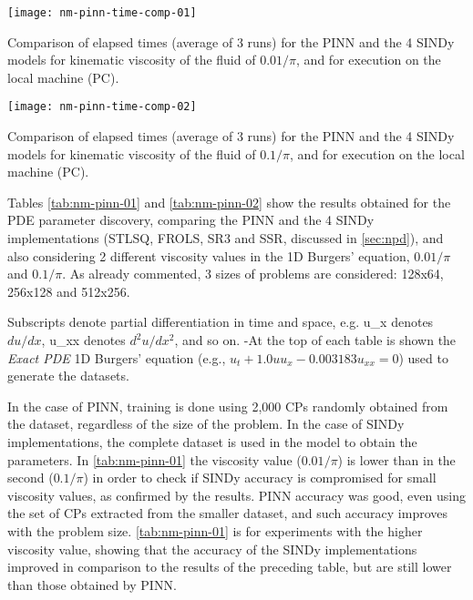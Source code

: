 \begin{table}[htb]\centering
\texttt{[image: nm-pinn-time-comp-01]}
\vspace{1em}
\caption{Comparison of elapsed times (average of 3 runs) for the PINN and the 4 SINDy models for kinematic viscosity of the fluid of ${0.01}/{\pi}$, and for execution on the local machine (PC).}
\label{tab:nm-pinn-time-comp-01}
\end{table}

\begin{table}[htb]\centering
\texttt{[image: nm-pinn-time-comp-02]}
\vspace{1em}
\caption{Comparison of elapsed times (average of 3 runs) for the PINN and the 4 SINDy models for kinematic viscosity of the fluid of ${0.1}/{\pi}$, and for execution on the local machine (PC).}
\label{tab:nm-pinn-time-comp-02}
\end{table}

Tables \ref{tab:nm-pinn-01} and \ref{tab:nm-pinn-02} show the results obtained for the PDE parameter discovery, comparing the  PINN and the 4 SINDy implementations (STLSQ, FROLS, SR3 and SSR, discussed in \autoref{sec:npd}), and also considering 2 different viscosity values in the 1D Burgers' equation, ${0.01}/{\pi}$ and ${0.1}/{\pi}$. As already commented, 3 sizes of problems are considered: 128x64, 256x128 and 512x256. 

Subscripts denote partial differentiation in time and space, e.g. u\_x denotes ${du}/{dx}$, u\_xx denotes ${d^2u}/{dx^2}$, and so on. -At the top of each table is shown the \textit{Exact PDE} 1D Burgers' equation (e.g., $u_t + 1.0 u u_x - 0.003183 u_{xx} = 0$) used to generate the datasets.

In the case of PINN, training is done using 2,000 CPs randomly obtained from the dataset, regardless of the size of the problem.  In the case of SINDy implementations, the complete dataset is used in the model to obtain the parameters. In \ref{tab:nm-pinn-01} the viscosity value (${0.01}/{\pi}$) is lower than in the second (${0.1}/{\pi}$) in order to check if SINDy accuracy is compromised for  small viscosity values, as confirmed by the results. PINN accuracy was good, even using the set of CPs extracted from the smaller dataset, and such accuracy improves with the problem size. \ref{tab:nm-pinn-01} is for experiments with the higher viscosity value, showing that the accuracy of the SINDy implementations improved in comparison to the results of the preceding table, but are still lower than those obtained by PINN.

